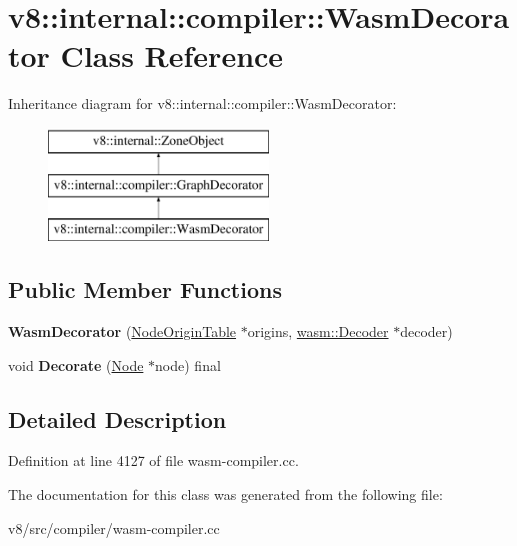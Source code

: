 \hypertarget{classv8_1_1internal_1_1compiler_1_1WasmDecorator}{}\section{v8\+:\+:internal\+:\+:compiler\+:\+:Wasm\+Decorator Class Reference}
\label{classv8_1_1internal_1_1compiler_1_1WasmDecorator}
Inheritance diagram for v8\+:\+:internal\+:\+:compiler\+:\+:Wasm\+Decorator\+:\begin{figure}[H]
\begin{center}
\leavevmode
\includegraphics[height=3.000000cm]{classv8_1_1internal_1_1compiler_1_1WasmDecorator}
\end{center}
\end{figure}
\subsection*{Public Member Functions}
\begin{DoxyCompactItemize}
\item 
\mbox{\label{classv8_1_1internal_1_1compiler_1_1WasmDecorator_ab47e6ebca3e7074bc7d1040f7dda09fa}} 
{\bfseries Wasm\+Decorator} (\mbox{\hyperlink{classv8_1_1internal_1_1compiler_1_1NodeOriginTable}{Node\+Origin\+Table}} $\ast$origins, \mbox{\hyperlink{classv8_1_1internal_1_1wasm_1_1Decoder}{wasm\+::\+Decoder}} $\ast$decoder)
\item 
\mbox{\label{classv8_1_1internal_1_1compiler_1_1WasmDecorator_ac73f423a6955545f54ebb1f3ae93753c}} 
void {\bfseries Decorate} (\mbox{\hyperlink{classv8_1_1internal_1_1compiler_1_1Node}{Node}} $\ast$node) final
\end{DoxyCompactItemize}


\subsection{Detailed Description}


Definition at line 4127 of file wasm-\/compiler.\+cc.



The documentation for this class was generated from the following file\+:\begin{DoxyCompactItemize}
\item 
v8/src/compiler/wasm-\/compiler.\+cc\end{DoxyCompactItemize}

